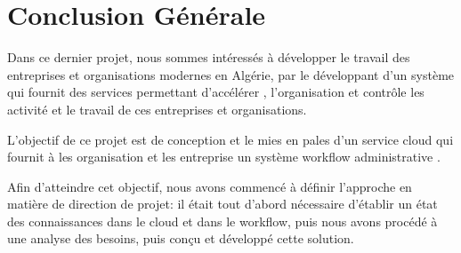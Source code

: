 \chapter*{Conclusion Générale }

Dans ce dernier projet, nous sommes intéressés à développer le travail des entreprises et organisations modernes en Algérie,
par le développant d'un système qui fournit des services permettant d’accélérer , l’organisation et contrôle  les activité  et le travail de ces   entreprises et organisations.



L’objectif de ce projet est de conception et le mies en pales d'un  service cloud qui fournit à les organisation et les entreprise un  système workflow administrative .   




Afin d’atteindre cet objectif, nous avons commencé à définir l’approche en matière de direction de projet: il était tout d’abord nécessaire d’établir un état des connaissances dans le cloud et dans le workflow, puis nous avons procédé à une analyse des besoins, puis conçu et développé cette solution. 